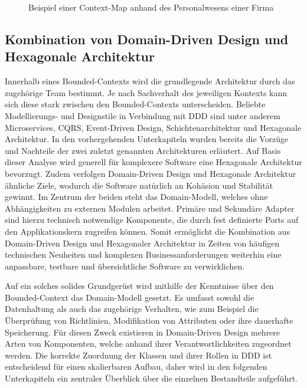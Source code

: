 \begin{figure}
	\centering
	\footnotesize
	
	\caption{Beispiel einer Context-Map anhand des Personalwesens einer Firma}
	\label{fig:Context-Map-Example}
\end{figure}

\subsection{Kombination von Domain-Driven Design und Hexagonale Architektur}

Innerhalb eines Bounded-Contexts wird die grundlegende Architektur durch das zugehörige Team bestimmt. Je nach Sachverhalt des jeweiligen Kontexts kann sich diese stark zwischen den Bounded-Contexts unterscheiden. Beliebte Modellierungs- und Designstile in Verbindung mit DDD sind unter anderem Microservices, \acrshort{CQRS}, Event-Driven Design, Schichtenarchitektur und Hexagonale Architektur. \cite[S. 113ff.]{Vernon.2015} In den vorhergehenden Unterkapiteln wurden bereits die Vorzüge und Nachteile der zwei zuletzt genannten Architekturen erläutert. Auf Basis dieser Analyse wird generell für komplexere Software eine Hexagonale Architektur bevorzugt. Zudem verfolgen Domain-Driven Design und Hexagonale Architektur ähnliche Ziele, wodurch die Software natürlich an Kohäsion und Stabilität gewinnt. Im Zentrum der beiden steht das Domain-Modell, welches ohne Abhängigkeiten zu externen Modulen arbeitet. Primäre und Sekundäre Adapter sind hierzu technisch notwendige Komponente, die durch fest definierte Ports auf den Applikationskern zugreifen können. Somit ermöglicht die Kombination aus Domain-Driven Design und Hexagonaler Architektur in Zeiten von häufigen technischen Neuheiten und komplexen Businessanforderungen weiterhin eine anpassbare, testbare und übersichtliche Software zu verwirklichen.

Auf ein solches solides Grundgerüst wird mithilfe der Kenntnisse über den Bounded-Context das Domain-Modell gesetzt. Es umfasst sowohl die Datenhaltung als auch das zugehörige Verhalten, wie zum Beispiel die Überprüfung von Richtlinien, Modifikation von Attributen oder ihre dauerhafte Speicherung. Für diesen Zweck existieren in Domain-Driven Design mehrere Arten von Komponenten, welche anhand ihrer Verantwortlichkeiten zugeordnet werden. Die korrekte Zuordnung der Klassen und ihrer Rollen in DDD ist entscheidend für einen skalierbaren Aufbau, daher wird in den folgenden Unterkapiteln ein zentraler Überblick über die einzelnen Bestandteile aufgeführt.

